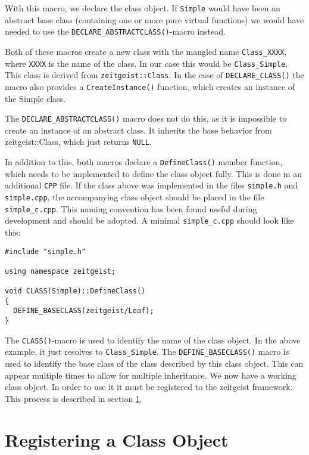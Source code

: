 With this macro, we declare the class object. If \texttt{Simple} would
have been an abstract base class (containing one or more pure virtual
functions) we would have needed to use the
\texttt{DECLARE\_ABSTRACTCLASS()}-macro instead. 

Both of these macros create a new class with the mangled name
\texttt{Class\_XXXX}, where \texttt{XXXX} is the name of the class. 
In our case this would be \texttt{Class\_Simple}. This class is derived
from \texttt{zeitgeist::Class}. In the case of
\texttt{DECLARE\_CLASS()} the macro also provides a \texttt{CreateInstance()}
function, which creates an instance of the Simple class. 

The \texttt{DECLARE\_ABSTRACTCLASS()} macro does not do this, as it is
impossible to create an instance of an abstract class. It inherits the
base behavior from zeitgeist::Class, which just returns
\texttt{NULL}. 

In addition to this, both macros declare a \texttt{DefineClass()}
member function, which needs to be implemented to define the class
object fully. This is done in an additional \texttt{CPP} file. If the
class above was implemented in the files \texttt{simple.h} and
\texttt{simple.cpp}, the accompanying class object should be placed in
the file \texttt{simple\_c.cpp}. This naming convention has been found
useful during development and should be adopted. A minimal
\texttt{simple\_c.cpp} should look like this:

\begin{verbatim}
#include "simple.h"

using namespace zeitgeist;

void CLASS(Simple)::DefineClass()
{
  DEFINE_BASECLASS(zeitgeist/Leaf);
}
\end{verbatim}


The \texttt{CLASS()}-macro is used to identify the name of the class
object. In the above example, it just resolves to
\texttt{Class\_Simple}. The \texttt{DEFINE\_BASECLASS()} macro is used to 
identify the base class of the class described by this class
object. This can appear multiple times to allow for multiple
inheritance. We now have a working class object. In order to use it it
must be registered to the zeitgeist framework. This process is
described in section \ref{sec:regobj}.

\section{Registering a Class Object}
\label{sec:regobj}

